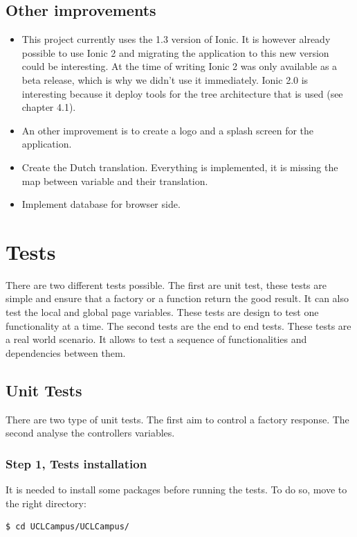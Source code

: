 \documentclass{eplmastersthesis}
\begin{document}
\subsection{Other improvements}
\begin{itemize}
\item This project currently uses the 1.3 version of Ionic. It is however already possible to use Ionic 2 and migrating the application to this new version could be interesting. At the time of writing Ionic 2 was only available as a beta release, which is why we didn't use it immediately. Ionic 2.0 is interesting because it deploy tools for the tree architecture that is used (see chapter 4.1).
\item An other improvement is to create a logo and a splash screen for the application.
\item Create the Dutch translation. Everything is implemented, it is missing the map between variable and their translation.
\item Implement database for browser side. 
\end{itemize}

\section{Tests}

There are two different tests possible. The first are unit test, these tests are simple and ensure that a factory or a function return the good result. It can also test the local and global page variables. These tests are design to test one functionality at a time.
The second tests are the end to end tests. These tests are a real world scenario. It allows to test a sequence of functionalities and dependencies between them.
\subsection{Unit Tests}
There are two type of unit tests. The first aim to control a factory response. The second analyse the controllers variables.
\subsubsection{Step 1, Tests installation} It is needed to install some packages before running the tests. To do so, move to the right directory:
\begin{lstlisting}[language=bash]
   $ cd UCLCampus/UCLCampus/
\end{lstlisting}
\end{document}
